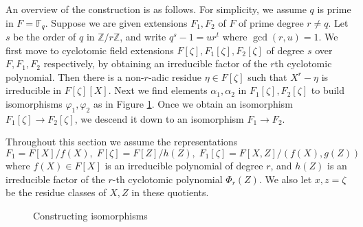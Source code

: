 \documentclass[12pt]{article}
\theoremstyle{plain}
\theoremstyle{definition}
\def\F{\ensuremath{\mathbb{F}}}
\begin{document}
An overview of the construction is as follows. For simplicity, we assume $q$ is prime in $F = 
\F_q$. Suppose we are given extensions $F_1, F_2$ of $F$ of prime degree $r \ne q$. Let $s$ be 
the order of $q$ in $\mathbb{Z} / r\mathbb{Z}$, and write $q^s - 1 = ur^t$ where $\gcd(r, u) = 1$. 
We first move to cyclotomic field extensions $F[\zeta], F_1[\zeta], F_2[\zeta]$ of degree $s$ over 
$F, F_1, F_2$ respectively, by obtaining an irreducible factor of the $r$th cyclotomic polynomial. 
Then there is a non-$r$-adic residue $\eta \in F[\zeta]$ such that $X^r - \eta$ is irreducible in 
$F[\zeta][X]$. Next we find elements $\alpha_1, \alpha_2$ in $F_1[\zeta], F_2[\zeta]$ to build 
isomorphisms $\varphi_1, \varphi_2$ as in Figure \ref{figure:isom1}. Once we obtain an isomorphism 
$F_1[\zeta] \rightarrow F_2[\zeta]$, we descend it down to an isomorphism $F_1 \rightarrow F_2$. 

Throughout this section we assume the representations
\begin{equation}
\label{equation:rep}
F_1 = F[X] / f(X), \; F[\zeta] = F[Z] / h(Z), \;
F_1[\zeta] = F[X, Z] / (f(X), g(Z))
\end{equation}
where $f(X) \in F[X]$ is an irreducible polynomial of degree $r$, and $h(Z)$ is an irreducible 
factor of the $r$-th cyclotomic polynomial $\Phi_r(Z)$. We also let $x, z = \zeta$ be the residue 
classes of $X, Z$ in these quotients.
\begin{figure}
	\begin{center}
		\caption{Constructing isomorphisms}
		\label{figure:isom1}
	\end{center}
\end{figure}
\end{document}
